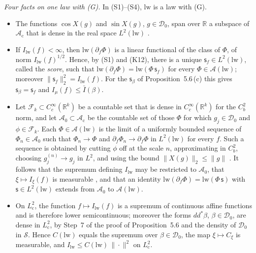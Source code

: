 \documentclass[11pt,letterpaper,reqno]{amsart}
\theoremstyle{definition}
\begin{document}
\emph{Four facts on one law with (G).}
In (S1)--(S4), $\mathrm{lw}$ is a law with (G).
\begin{itemize}
\item[(S1)] The functions $\cos X(g)$ and $\sin X(g)$, $g\in\mathcal D_0$, span over $\mathbb R$ a subspace of $\mathcal A_{\mathrm c}$ that is dense in the real space $L^2(\mathrm{lw})$ \cite[Lemma~8.12\,(i)]{QEDI}.
\item[(S2)] If $I_{\mathrm{lw}}(f)<\infty$, then $\mathrm{lw}(\partial_f\Phi)$ is a linear functional of the class of $\Phi$, of norm $I_{\mathrm{lw}}(f)^{1/2}$.
Hence, by (S1) and (K12), there is a unique $\mathsf s_f\in L^2(\mathrm{lw})$, called the \emph{score}, such that $\mathrm{lw}(\partial_f\Phi)=\mathrm{lw}(\Phi\,\mathsf s_f)$ for every $\Phi\in\mathcal A(\mathrm{lw})$;
moreover $\|\mathsf s_f\|_2^2=I_{\mathrm{lw}}(f)$.
For the $\mathsf s_\beta$ of Proposition~5.6\,(c) this gives $\mathsf s_\beta=\mathsf s_f$ and $I_\mu(f)\le\bar I(\beta)$.
\item[(S3)] Let $\mathcal F_k\subset C_c^\infty(\mathbb R^k)$ be a countable set that is dense in $C_c^\infty(\mathbb R^k)$ for the $C_b^2$ norm, and let $\mathcal A_0\subset\mathcal A_{\mathrm c}$ be the countable set of those $\Phi$ for which $g_j\in\mathcal D_0$ and $\phi\in\mathcal F_k$.
Each $\Phi\in\mathcal A(\mathrm{lw})$ is the limit of a uniformly bounded sequence of $\Phi_n\in\mathcal A_0$ such that $\Phi_n\to\Phi$ and $\partial_f\Phi_n\to\partial_f\Phi$ in $L^2(\mathrm{lw})$ for every $f$.
Such a sequence is obtained by cutting $\phi$ off at the scale $n$, approximating in $C^2_b$, choosing $g^{(n)}_j\to g_j$ in $L^2$, and using the bound $\|X(g)\|_2\le\|g\|$ \cite[Lemma~14.3\,(a)]{QEDII}.
It follows that the supremum defining $I_{\mathrm{lw}}$ may be restricted to $\mathcal A_0$, that $\xi\mapsto I_\xi(f)$ is measurable \cite[Proposition~45.6\,(d0)]{QEDIII}, and that an identity $\mathrm{lw}(\partial_f\Phi)=\mathrm{lw}(\Phi\,\mathsf s)$ with $\mathsf s\in L^2(\mathrm{lw})$ extends from $\mathcal A_0$ to $\mathcal A(\mathrm{lw})$.
\item[(S4)] On $L^2_{\mathrm c}$, the function $f\mapsto I_{\mathrm{lw}}(f)$ is a supremum of continuous affine functions and is therefore lower semicontinuous;
moreover the forms $dd^*\beta$, $\beta\in\mathcal D_0$, are dense in $L^2_{\mathrm c}$, by Step~7 of the proof of Proposition~5.6 and the density of $\mathcal D_0$ in $\mathcal S$.
Hence $C(\mathrm{lw})$ equals the supremum over $\beta\in\mathcal D_0$, the map $\xi\mapsto C_\xi$ is measurable, and $I_{\mathrm{lw}}\le C(\mathrm{lw})\,\|\cdot\|^2$ on $L^2_{\mathrm c}$.
\end{itemize}
\end{document}
